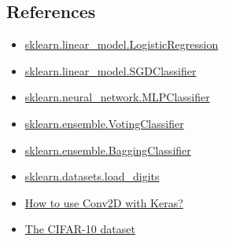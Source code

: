 \documentclass{article}
\begin{document}
\begin{flushleft}
\section{References}
\begin{itemize}
    \item \hyperlink{https://scikit-learn.org/stable/modules/generated/sklearn.linear_model.LogisticRegression.html#}{sklearn.linear\_model.LogisticRegression}
    \item \hyperlink{https://scikit-learn.org/stable/modules/generated/sklearn.linear_model.SGDClassifier.html#}{sklearn.linear\_model.SGDClassifier}
    \item \hyperlink{https://scikit-learn.org/stable/modules/generated/sklearn.neural_network.MLPClassifier.html}{sklearn.neural\_network.MLPClassifier}
    \item \hyperlink{https://scikit-learn.org/stable/modules/generated/sklearn.ensemble.VotingClassifier.html#}{sklearn.ensemble.VotingClassifier}
    \item \hyperlink{https://scikit-learn.org/stable/modules/generated/sklearn.ensemble.BaggingClassifier.html#}{sklearn.ensemble.BaggingClassifier}
    \item \hyperlink{https://scikit-learn.org/stable/modules/generated/sklearn.datasets.load_digits.html}{sklearn.datasets.load\_digits}
    \item \hyperlink{https://www.machinecurve.com/index.php/2020/03/30/how-to-use-conv2d-with-keras/}{How to use Conv2D with Keras?}
    \item \hyperlink{https://www.cs.toronto.edu/\%7Ekriz/cifar.html}{The CIFAR-10 dataset}
    

\end{itemize}

\end{flushleft}
\end{document}
